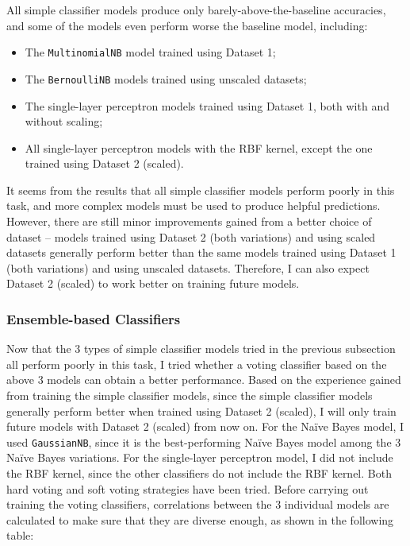 \documentclass[12pt,twoside,a4paper]{article}
\begin{document}
All simple classifier models produce only barely-above-the-baseline accuracies, and some of the models even perform worse the baseline model, including:

\begin{itemize}
    \item The \texttt{MultinomialNB} model trained using Dataset 1;
    \item The \texttt{BernoulliNB} models trained using unscaled datasets;
    \item The single-layer perceptron models trained using Dataset 1, both with and without scaling;
    \item All single-layer perceptron models with the RBF kernel, except the one trained using Dataset 2 (scaled).
\end{itemize}

It seems from the results that all simple classifier models perform poorly in this task, and more complex models must be used to produce helpful predictions. However, there are still minor improvements gained from a better choice of dataset -- models trained using Dataset 2 (both variations) and using scaled datasets generally perform better than the same models trained using Dataset 1 (both variations) and using unscaled datasets. Therefore, I can also expect Dataset 2 (scaled) to work better on training future models. 

\subsubsection{Ensemble-based Classifiers}

Now that the 3 types of simple classifier models tried in the previous subsection all perform poorly in this task, I tried whether a voting classifier based on the above 3 models can obtain a better performance. Based on the experience gained from training the simple classifier models, since the simple classifier models generally perform better when trained using Dataset 2 (scaled), I will only train future models with Dataset 2 (scaled) from now on. For the Naïve Bayes model, I used \texttt{GaussianNB}, since it is the best-performing Naïve Bayes model among the 3 Naïve Bayes variations. For the single-layer perceptron model, I did not include the RBF kernel, since the other classifiers do not include the RBF kernel. Both hard voting and soft voting strategies have been tried. Before carrying out training the voting classifiers, correlations between the 3 individual models are calculated to make sure that they are diverse enough, as shown in the following table:
\end{document}
